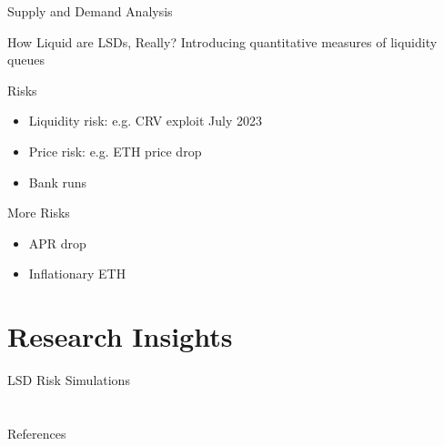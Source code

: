 \documentclass{beamer}
\begin{document}
\begin{frame}{Supply and Demand Analysis}
    
\end{frame}

\begin{frame}{How Liquid are LSDs, Really?}
    Introducing quantitative measures of liquidity\\
    queues
\end{frame}


\begin{frame}{Risks}
    \begin{itemize}
        \item Liquidity risk: e.g. CRV exploit July 2023
        \item Price risk: e.g. ETH price drop
        \item Bank runs
    \end{itemize}
\end{frame}


\begin{frame}{More Risks}
    \begin{itemize}
        \item APR drop
        \item Inflationary ETH
    \end{itemize}
\end{frame}

\section{Research Insights}

\begin{frame}{LSD Risk Simulations}
    
\end{frame}

\section*{}

\begin{frame}[allowframebreaks]{References}
    \nocite{*}
    \printbibliography
\end{frame}
\end{document}
